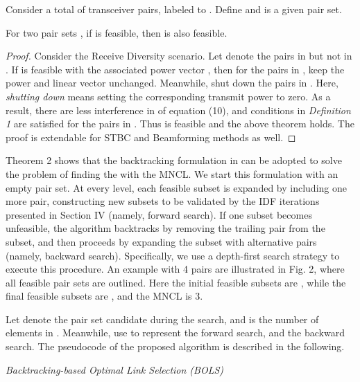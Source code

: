 \documentclass[draftcls,onecolumn,peerview,12pt]{IEEEtran}
\begin{document}
Consider a total of  transceiver pairs, labeled  to .
Define  and  is a given pair
set.

\begin{theorem}
For two pair sets , if  is
feasible, then  is also feasible.
\end{theorem}

\begin{proof}
Consider the  Receive Diversity scenario. Let
 denote the pairs in  but not
in . If  is feasible with the associated power
vector , then for the pairs in , keep the power
 and linear vector  unchanged. Meanwhile, shut
down the pairs in . Here,
\textit{shutting down} means setting the corresponding transmit
power to zero. As a result, there are less interference in
 of equation (10), and conditions in
\textit{Definition 1} are satisfied for the pairs in . Thus
 is feasible and the above theorem holds. The proof is
extendable for STBC and Beamforming methods as well.
\end{proof}

Theorem 2 shows that the backtracking formulation in
\cite{9_interference_temp, 24_computer_algorithms} can be adopted to
solve the problem of finding the  with the MNCL. We start this
formulation with an empty pair set. At every level, each feasible
subset is expanded by including one more pair, constructing new
subsets to be validated by the IDF iterations presented in Section
IV (namely, forward search). If one subset becomes unfeasible, the
algorithm backtracks by removing the trailing pair from the subset,
and then proceeds by expanding the subset with alternative pairs
(namely, backward search). Specifically, we use a depth-first search
strategy to execute this procedure. An example with 4 pairs are
illustrated in Fig. 2, where all feasible pair sets are outlined.
Here the initial feasible subsets are , while the final feasible subsets are , and the MNCL is 3.



Let  denote the pair set candidate during the search,
and  is the number of elements in
. Meanwhile, use  to represent the
forward search, and  the backward search. The
pseudocode of the proposed algorithm is described in the following.

\textit{Backtracking-based Optimal Link Selection (BOLS)}
\end{document}
